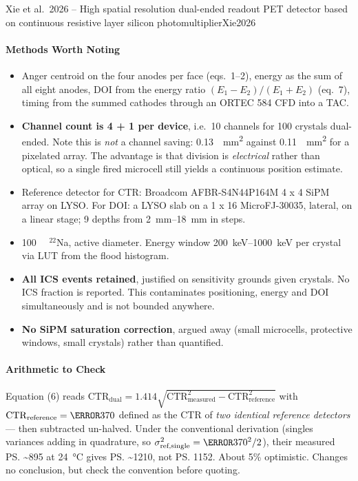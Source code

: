 \begin{papernote}{Xie et al.\ 2026 -- High spatial resolution dual-ended readout PET detector based on continuous resistive layer silicon photomultiplier}{Xie2026}
\paragraph{Methods Worth Noting}
\begin{itemize}
	\item Anger centroid on the four anodes per face (eqs.\ 1--2), energy as the
		sum of all eight anodes, DOI from the energy ratio
		$(E_1 - E_2)/(E_1 + E_2)$ (eq.\ 7), timing from the summed cathodes
		through an ORTEC 584 CFD into a TAC.
	\item \textbf{Channel count is 4 + 1 per device}, i.e.\ 10 channels for 100
		crystals dual-ended. Note this is \emph{not} a channel saving:
		\qty{0.13}{\per\milli\metre\squared} against
		\qty{0.11}{\per\milli\metre\squared} for a  pixelated array. The
		advantage is that division is \emph{electrical} rather than optical, so
		a single fired microcell still yields a continuous position estimate.
	\item Reference detector for CTR: Broadcom AFBR-S4N44P164M 4 x 4 SiPM array
		on  LYSO. For DOI: a
		 LYSO slab on a 1 x 16
		MicroFJ-30035, lateral, on a linear stage; 9 depths from
		\qtyrange{2}{18}{\milli\metre} in  steps.
	\item \qty{100}{\micro\curie} $^{22}$Na,  active diameter.
		Energy window \qtyrange{200}{1000}{\kilo\electronvolt} per crystal via
		LUT from the flood histogram.
	\item \textbf{All ICS events retained}, justified on sensitivity grounds
		given  crystals. No ICS fraction is reported. This contaminates
		positioning, energy and DOI simultaneously and is not bounded anywhere.
	\item \textbf{No SiPM saturation correction}, argued away (small microcells,
		 protective windows, small crystals) rather than quantified.
\end{itemize}
 
\paragraph{Arithmetic to Check}
Equation (6) reads
$\mathrm{CTR}_{\text{dual}} = 1.414\sqrt{\mathrm{CTR}_{\text{measured}}^2
- \mathrm{CTR}_{\text{reference}}^2}$
with $\mathrm{CTR}_{\text{reference}} = \ps{370}$ defined as the CTR of
\emph{two identical reference detectors} --- then subtracted un-halved. Under the
conventional derivation (singles variances adding in quadrature, so
$\sigma^2_{\text{ref,single}} = \ps{370}^2/2$), their measured \ps{\sim895} at
\qty{24}{\degreeCelsius} gives \ps{\sim1210}, not \ps{1152}. About 5\%
optimistic. Changes no conclusion, but check the convention before quoting.
 

\end{papernote}
